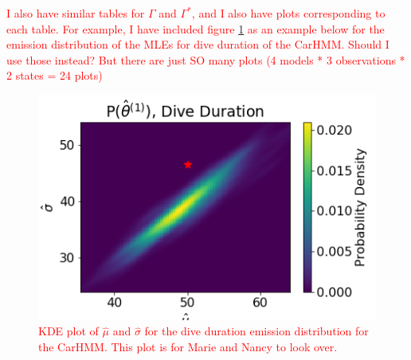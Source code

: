 \textcolor{red}{I also have similar tables for $\Gamma$ and $\Gamma^*$, and I also have plots corresponding to each table. For example, I have included figure \ref{fig:MLE_dist} as an example below for the emission distribution of the MLEs for dive duration of the CarHMM. Should I use those instead? But there are just SO many plots (4 models * 3 observations * 2 states = 24 plots)}

\begin{figure}[ht]
	\centering
	\includegraphics[width=5in]{../Plots/hmm_FV_MLE_density_dive_duration_-1.png}
	\caption{\textcolor{red}{KDE plot of $\hat \mu$ and $\hat \sigma$ for the dive duration emission distribution for the CarHMM. This plot is for Marie and Nancy to look over.}}
	\label{fig:MLE_dist}
\end{figure}




